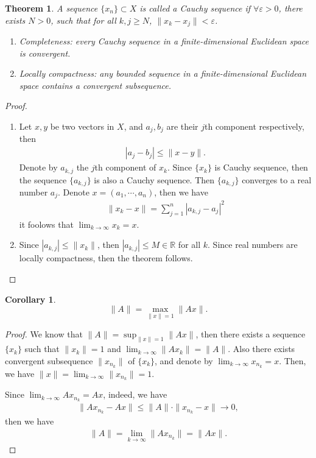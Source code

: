 \documentclass[11pt]{book}
\newtheorem{theorem}{Theorem}[section]
\newtheorem{corollary}{Corollary}[section]
\theoremstyle{definition}
\numberwithin{equation}{subsection}
\begin{document}
\begin{theorem}
A sequence $\{x_n\}\subset X$ is called a Cauchy sequence if $\forall \varepsilon > 0$, there exists $N > 0$,  such that for all $k, j \geq N$, $\|x_k - x_j\| < \varepsilon$. 
\begin{enumerate}[label=(\roman*)]
    \item Completeness: every Cauchy sequence in a finite-dimensional Euclidean space is convergent.
    \item Locally compactness: any bounded sequence in a finite-dimensional Euclidean space contains a convergent subsequence. 
\end{enumerate}
\end{theorem}
\begin{proof}
~\begin{enumerate}[label=(\roman*)]
    \item Let $x,y$ be two vectors in $X$, and $a_j, b_j$ are their $j$th component respectively, then 
    \begin{align*}
        |a_j - b_j| \leq \|x - y\|.
    \end{align*}
    Denote by $a_{k,j}$ the $j$th component of $x_k$. Since $\{x_k\}$ is Cauchy sequence, then the sequence $\{a_{k,j}\}$ is also a Cauchy sequence. Then $\{a_{k,j}\}$ converges to a real number $a_j$. Denote $x = (a_1, \cdots, a_n)$, then we have 
    \begin{align*}
        \|x_k - x\| = \sum^n_{j=1} |a_{k,j} - a_j|^2
    \end{align*}
    it foolows that $\lim_{k\to\infty} x_k = x$.
    \item Since $|a_{k,j}| \leq \|x_k\|$, then $|a_{k,j}| \leq M \in\mathbb{R}$ for all $k$. Since real numbers are locally compactness, then the theorem follows.
\end{enumerate}

\end{proof}

\medskip

\begin{corollary}
$$\|A\| = \max_{\|x\| = 1} \|Ax\|.$$
\end{corollary}
\begin{proof}
We know that $\|A\| = \sup_{\|x\| = 1} \|Ax\|$, then there exists a sequence $\{x_k\}$ such that $\|x_k\| = 1$ and $\lim_{k\to\infty} \|Ax_k\| = \|A\|$. Also there exists convergent subsequence $\|x_{n_k}\|$ of $\{x_k\}$, and denote by $\lim_{k\to\infty} x_{n_k} = x$. Then, we have $\|x\| = \lim_{k\to\infty} \|x_{n_k}\| = 1$. 

Since $\lim_{k\to\infty} Ax_{n_k} = Ax$, indeed, we have
\begin{align*}
    \|Ax_{n_k} - Ax\| \leq \|A\| \cdot \|x_{n_k} - x\| \to 0,
\end{align*}
then we have 
\begin{align*}
    \|A\| = \lim_{k\to\infty} \|Ax_{n_k}\| = \|Ax\|.
\end{align*}
\end{proof}
\end{document}
